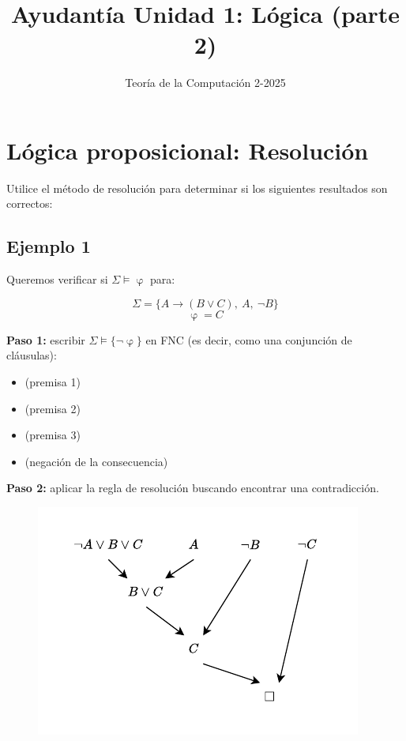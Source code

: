 \documentclass{article}
\begin{document}
\title{Ayudantía Unidad 1: Lógica (parte 2)}
\author{Teoría de la Computación 2-2025}
\date{}

\maketitle

\section{Lógica proposicional: Resolución}
Utilice el método de resolución para determinar si los siguientes resultados son
correctos:

\subsection{Ejemplo 1}
Queremos verificar si $\Sigma \vDash \upvarphi$ para:

$$\Sigma = \{A \rightarrow (B \vee C),\ A,\ \neg B\}$$
$$\upvarphi = C$$

\textbf{Paso 1:} escribir $\Sigma \vDash \{\neg \upvarphi\}$ en FNC (es decir,
como una conjunción de cláusulas):
\begin{itemize}
  \item{
        (premisa 1)}

  \item{ (premisa 2)}
  \item{ (premisa 3)}
  \item{ (negación de la
        consecuencia)}
\end{itemize}

\textbf{Paso 2:} aplicar la regla de resolución buscando encontrar una
contradicción.

\begin{figure}[H]
  \centering
  \includegraphics[width=.45\textwidth]{images/resolucion_01.pdf}
\end{figure}
\end{document}
